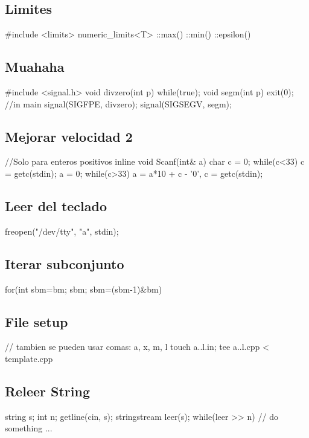 \subsection*{Limites}
\begin{code}
#include <limits>
numeric_limits<T>
	::max()
	::min()
	::epsilon()
\end{code}
\subsection*{Muahaha}
\begin{code}
#include <signal.h>
void divzero(int p){
	while(true);}
void segm(int p){
	exit(0);}
//in main
signal(SIGFPE, divzero);
signal(SIGSEGV, segm);
\end{code}
\subsection*{Mejorar velocidad 2}
\begin{code}
//Solo para enteros positivos
inline void Scanf(int& a){
	char c = 0;
	while(c<33) c = getc(stdin);
	a = 0;
	while(c>33)	a = a*10 + c - '0', c = getc(stdin);
}
\end{code}
\subsection*{Leer del teclado}
\begin{code}
freopen("/dev/tty", "a", stdin);
\end{code}
\subsection*{Iterar subconjunto}
\begin{code}
for(int sbm=bm; sbm; sbm=(sbm-1)&bm)
\end{code}
\subsection*{File setup}
\begin{code}
// tambien se pueden usar comas: {a, x, m, l}
touch {a..l}.in; tee {a..l}.cpp < template.cpp
\end{code}
\subsection*{Releer String}
\begin{code}
string s; int n;
getline(cin, s);
stringstream leer(s);
while(leer >> n){
	// do something ...
}
\end{code}

